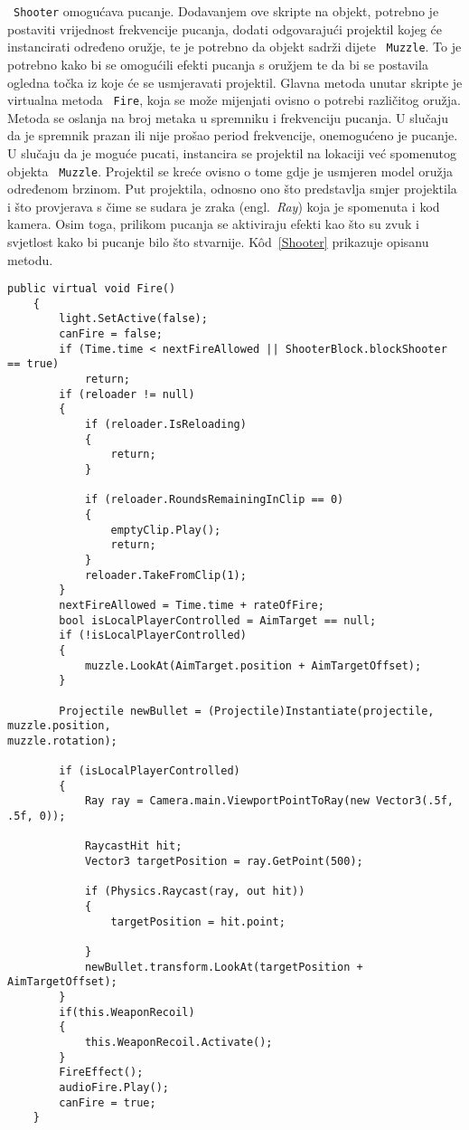 ~\texttt{Shooter} omogućava pucanje. Dodavanjem ove skripte na objekt, potrebno je postaviti
vrijednost frekvencije pucanja, dodati odgovarajući projektil kojeg će instancirati
određeno oružje, te je potrebno da objekt sadrži dijete ~\texttt{Muzzle}. To je potrebno kako
bi se omogućili efekti pucanja s oružjem te da bi se postavila ogledna točka iz koje
će se usmjeravati projektil. Glavna metoda unutar skripte je virtualna metoda ~\texttt{Fire},
koja se može mijenjati ovisno o potrebi različitog oružja. Metoda se oslanja na broj
metaka u spremniku i frekvenciju pucanja. U slučaju da je spremnik prazan ili nije
prošao period frekvencije, onemogućeno je pucanje. U slučaju da je moguće pucati,
instancira se projektil na lokaciji već spomenutog objekta ~\texttt{Muzzle}. Projektil se
kreće ovisno o tome gdje je usmjeren model oružja određenom brzinom. Put projektila,
odnosno ono što predstavlja smjer projektila i što provjerava s čime se sudara je
zraka (engl.~\textit{Ray}) koja je spomenuta i kod kamera. Osim toga, prilikom
pucanja se aktiviraju efekti kao što su zvuk i svjetlost kako bi pucanje bilo što
stvarnije. K\^od~\ref{Shooter} prikazuje opisanu metodu.
\begin{lstlisting}[caption={Skripta pucanja}, label=Shooter]
public virtual void Fire()
    {
        light.SetActive(false);
        canFire = false;
        if (Time.time < nextFireAllowed || ShooterBlock.blockShooter == true)
            return;
        if (reloader != null)
        {
            if (reloader.IsReloading)
            {
                return;
            }

            if (reloader.RoundsRemainingInClip == 0)
            {
                emptyClip.Play();
                return;
            }
            reloader.TakeFromClip(1);
        }
        nextFireAllowed = Time.time + rateOfFire;
        bool isLocalPlayerControlled = AimTarget == null;
        if (!isLocalPlayerControlled)
        {
            muzzle.LookAt(AimTarget.position + AimTargetOffset);
        }

        Projectile newBullet = (Projectile)Instantiate(projectile, muzzle.position,
muzzle.rotation);

        if (isLocalPlayerControlled)
        {
            Ray ray = Camera.main.ViewportPointToRay(new Vector3(.5f, .5f, 0));

            RaycastHit hit;
            Vector3 targetPosition = ray.GetPoint(500);

            if (Physics.Raycast(ray, out hit))
            {
                targetPosition = hit.point;

            }
            newBullet.transform.LookAt(targetPosition + AimTargetOffset);
        }
        if(this.WeaponRecoil)
        {
            this.WeaponRecoil.Activate();
        }
        FireEffect();
        audioFire.Play();
        canFire = true;
    }
\end{lstlisting}

